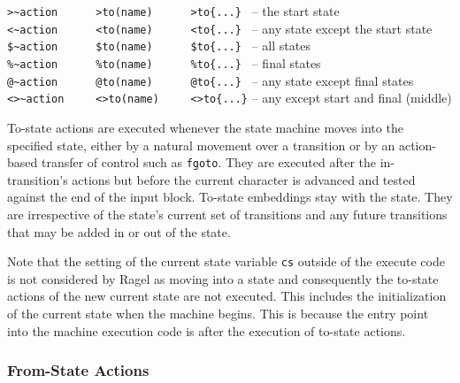 \documentclass[letterpaper,11pt,oneside]{book}
\begin{document}
\noindent\hspace*{24pt}\verb|>~action      >to(name)      >to{...} | -- the start state\\
\noindent\hspace*{24pt}\verb|<~action      <to(name)      <to{...} | -- any state except the start state\\
\noindent\hspace*{24pt}\verb|$~action      $to(name)      $to{...} | -- all states\\
\noindent\hspace*{24pt}\verb|%~action      %to(name)      %to{...} | -- final states\\
\noindent\hspace*{24pt}\verb|@~action      @to(name)      @to{...} | -- any state except final states\\
\noindent\hspace*{24pt}\verb|<>~action     <>to(name)     <>to{...}| -- any except start and final (middle)
\vspace{12pt}


To-state actions are executed whenever the state machine moves into the
specified state, either by a natural movement over a transition or by an
action-based transfer of control such as \verb|fgoto|. They are executed after the
in-transition's actions but before the current character is advanced and
tested against the end of the input block. To-state embeddings stay with the
state. They are irrespective of the state's current set of transitions and any
future transitions that may be added in or out of the state.

Note that the setting of the current state variable \verb|cs| outside of the
execute code is not considered by Ragel as moving into a state and consequently
the to-state actions of the new current state are not executed. This includes
the initialization of the current state when the machine begins.  This is
because the entry point into the machine execution code is after the execution
of to-state actions.

\subsubsection{From-State Actions}
\end{document}
